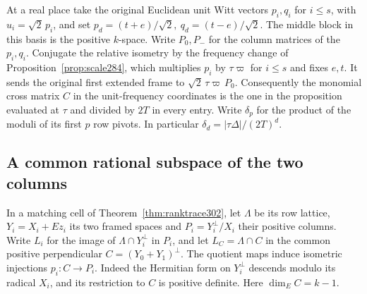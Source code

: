 \documentclass[a4paper,11pt]{article}
\theoremstyle{definition}
\theoremstyle{remark}
\numberwithin{equation}{section}
\begin{document}
At a real place take the original Euclidean unit Witt vectors
\(p_i,q_i\) for \(i\le s\), with \(u_i=\sqrt2\,p_i\), and set
\(p_d=(t+e)/\sqrt2,\ q_d=(t-e)/\sqrt2\).
The middle block in this basis is the positive \(k\)-space.
Write \(P_0,P_-\) for the column matrices of the \(p_i,q_i\).
Conjugate the relative isometry by the frequency change of
Proposition~\ref{prop:scale284}, which multiplies \(p_i\) by
\(\tau\varpi\) for \(i\le s\) and fixes \(e,t\).
It sends the original first extended frame to
\(\sqrt2\,\tau\varpi\,P_0\). Consequently the monomial
cross matrix \(C\) in the unit-frequency coordinates is the
one in the proposition evaluated at \(\tau\) and divided by
\(2T\) in every entry. Write \(\delta_p\) for the product of
the moduli of its first \(p\) row pivots. In particular
\(\delta_d=|\tau\Delta|/(2T)^d\).

\subsection{A common rational subspace of the two columns}\label{nav:IV-56}
In a matching cell of Theorem~\ref{thm:ranktrace302}, let
\(\Lambda\) be its row lattice, \(Y_i=X_i+Ez_i\) its two
framed spaces and \(P_i=Y_i^\perp/X_i\) their positive
columns. Write \(L_i\) for the image of \(\Lambda\cap Y_i^\perp\)
in \(P_i\), and let \(L_C=\Lambda\cap C\) in the common
positive perpendicular \(C=(Y_0+Y_1)^\perp\). The quotient
maps induce isometric injections \(p_i:C\to P_i\).
Indeed the Hermitian form on \(Y_i^\perp\) descends modulo
its radical \(X_i\), and its restriction to \(C\) is positive
definite. Here \(\dim_E C=k-1\).
\end{document}
